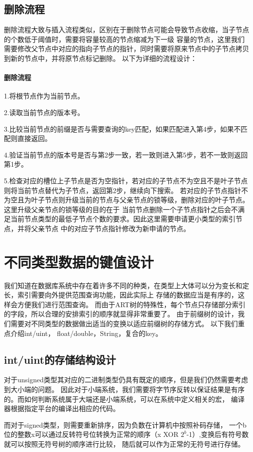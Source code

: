 \subsection{删除流程}
删除流程大致与插入流程类似，区别在于删除节点可能会导致节点收缩，当子节点的个数低于阈值时，需要将容量较高的节点缩减为下一级
容量的节点，这里我们需要修改父节点中对应的指向子节点的指针，同时需要将原来节点中的子节点拷贝到新的节点中，并将原节点标记删除。
以下为详细的流程设计：
\paragraph{删除流程}
1.将根节点作为当前节点。

2.读取当前节点的版本号。

3.比较当前节点的前缀是否与需要查询的key匹配，如果匹配进入第4步，如果不匹配则直接返回。

4.验证当前节点的版本号是否与第2步一致，若一致则进入第5步，若不一致则返回第1步。

5.检查对应的槽位上子节点是否为空指针，若对应的子节点不为空且不是叶子节点则将当前节点替代为子节点，返回第2步，继续向下搜索。
若对应的子节点指针不为空且为叶子节点则升级当前的节点与父亲节点的锁等级，删除对应的叶子节点。这里升级父亲节点的锁等级的目的在于
当前节点删除一个子节点指针之后会不满足当前节点类型的最低子节点个数的要求。因此这里需要申请更小类型的索引节点，并将父亲节点
中的对应子节点指针修改为新申请的节点。

\section{不同类型数据的键值设计}
我们知道在数据库系统中存在着许多不同的种类，在类型上大体可以分为变长和定长，索引需要向外提供范围查询功能，因此实际上
存储的数据应当是有序的，这样会方便我们进行范围查询。
而由于ART树的特殊性，每个节点只存储部分索引的字段，所以合理的安排索引的顺序就显得非常重要了。
由于前缀树的设计，我们需要对不同类型的数据做出适当的变换以适应前缀树的存储方式。
以下我们重点介绍int/uint， float/double，String，复合的key。

\subsection{int/uint的存储结构设计}
对于unsigned类型其对应的二进制类型仍具有既定的顺序，但是我们仍然需要考虑到大小端的问题。
因此对于小端系统，我们需要将字节序反转以保证结果是有序的。而如何判断系统属于大端还是小端系统，可以在系统中定义相关的宏，
编译器根据指定平台的编译出相应的代码。

而对于signed类型，则需要重新排序，因为负数在计算机中按照补码存储，
一个b位的整数x可以通过反转符号位转换为正常的顺序（x XOR $2^b$-1）,变换后有符号数就可以按照无符号树的顺序进行比较，
随后就可以作为正常的无符号进行存储。

